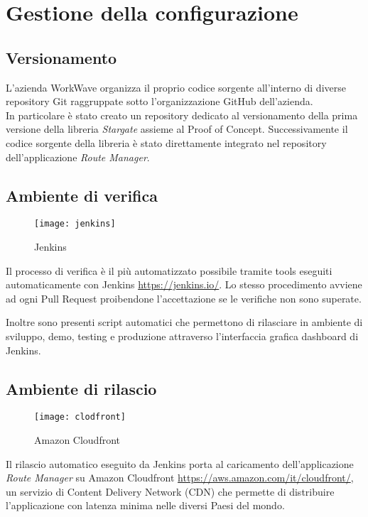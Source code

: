 \section{Gestione della configurazione}

\subsection{Versionamento}

L'azienda WorkWave organizza il proprio codice sorgente all'interno di diverse repository Git raggruppate sotto l'organizzazione GitHub dell'azienda. \\

In particolare è stato creato un repository dedicato al versionamento della prima versione della libreria \textit{Stargate} assieme al Proof of Concept. Successivamente il codice sorgente della libreria è stato direttamente integrato nel repository dell'applicazione \textit{Route Manager}.

\subsection{Ambiente di verifica}

\begin{figure}[H] 
  \centering 
  \texttt{[image: jenkins]} 
  \caption{Jenkins}
\end{figure}

Il processo di verifica è il più automatizzato possibile tramite tools eseguiti automaticamente con Jenkins \url{https://jenkins.io/}. Lo stesso procedimento avviene ad ogni Pull Request proibendone l’accettazione se le verifiche non sono superate.

Inoltre sono presenti script automatici che permettono di rilasciare in ambiente di sviluppo, demo, testing e produzione attraverso l'interfaccia grafica dashboard di Jenkins.

\subsection{Ambiente di rilascio}

\begin{figure}[H] 
  \centering 
  \texttt{[image: clodfront]} 
  \caption{Amazon Cloudfront}
\end{figure}

Il rilascio automatico eseguito da Jenkins porta al caricamento dell'applicazione \textit{Route Manager} su Amazon Cloudfront \url{https://aws.amazon.com/it/cloudfront/}, un servizio di Content Delivery Network (CDN) che permette di distribuire l'applicazione con latenza minima nelle diversi Paesi del mondo.

